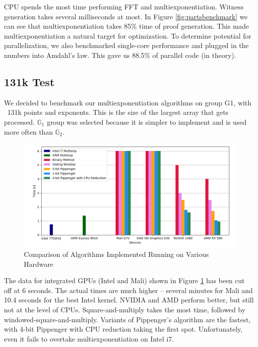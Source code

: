 \noindent CPU spends the most time performing FFT and multiexponentiation. Witness generation takes several milliseconds at most. In Figure \ref{fig:partsbenchmark} we can see that multiexponentiation takes 85\% time of proof generation. This made multiexponentiation a natural target for optimization. To determine potential for parallelization, we also benchmarked single-core performance and plugged in the numbers into Amdahl's law. This gave us 88.5\% of parallel code (in theory).\\

\subsection{131k Test}

We decided to benchmark our multiexponentiation algorithms on group G1, with ~131k points and exponents. This is the size of the largest array that gets processed. $\mathbb{G}_1$ group was selected because it is simpler to implement and is used more often than $\mathbb{G}_2$.
\begin{figure}[h]
    \includegraphics[width=\linewidth]{Figures/finalresults.png}
    \caption{Comparison of Algorithms Implemented Running on Various Hardware}
    \label{fig:finalresults}
\end{figure}
 \noindent The data for integrated GPUs (Intel and Mali) shown in Figure \ref{fig:finalresults} has been cut off at 6 seconds. The actual times are much higher -- several minutes for Mali and 10.4 seconds for the best Intel kernel. NVIDIA and AMD perform better, but still not at the level of CPUs. Square-and-multiply takes the most time, followed by windowed-square-and-multiply. Variants of Pippenger's algorithm are the fastest, with 4-bit Pippenger with CPU reduction taking the first spot. Unfortunately, even it fails to overtake multiexponentiation on Intel i7.
